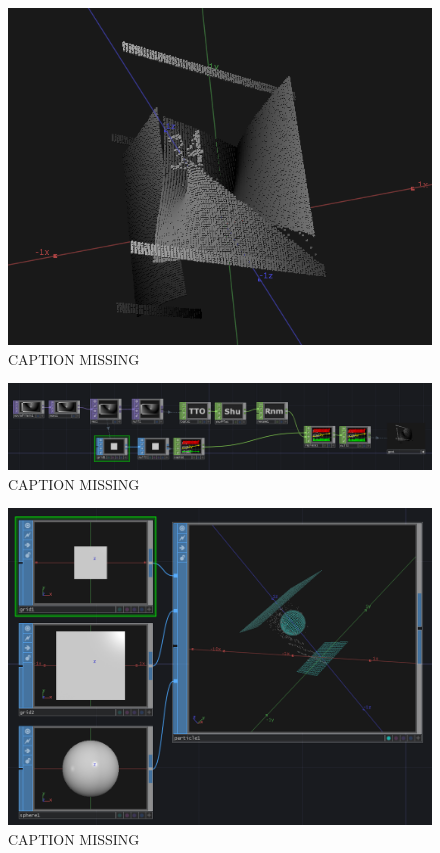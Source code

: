 \begin{figure}[H]
	\centering
	\includegraphics[width=\textwidth]{img/convert2Dto3D.PNG}
	\caption[shortCaption]
	{CAPTION MISSING}
	\label{fig:label}
\end{figure}



\begin{figure}[H]
	\centering
	\includegraphics[width=\textwidth]{img/convert2Dto3D2.PNG}
	\caption[shortCaption]
	{CAPTION MISSING}
	\label{fig:label}
\end{figure}



\begin{figure}[H]
	\centering
	\includegraphics[width=\textwidth]{img/particles1.PNG}
	\caption[shortCaption]
	{CAPTION MISSING}
	\label{fig:label}
\end{figure}



